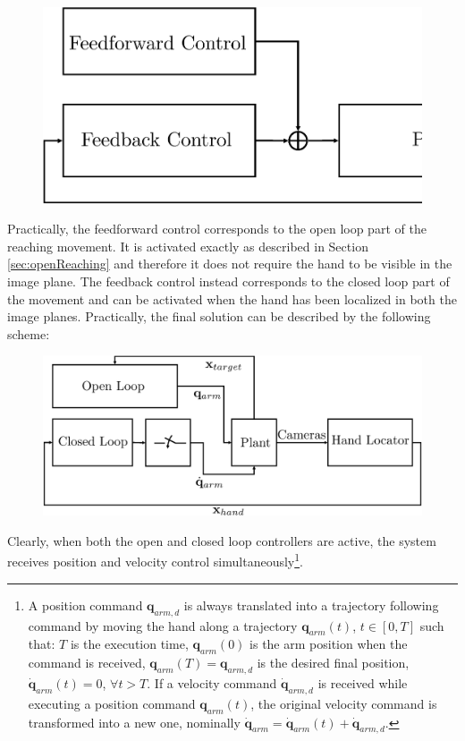 \begin{figure}[th!]
\begin{center}
\includegraphics[scale = 0.25]{Figure/OpenVSClosedLoop.eps}
\end{center}
\end{figure}

Practically, the feedforward control corresponds to the open loop part of the reaching movement.
It is activated exactly as described in Section \ref{sec:openReaching} and therefore it does not
require the hand to be visible in the image plane. The feedback control
instead corresponds to the closed loop part of the movement and can be activated when the hand
has been localized in both the image planes. Practically, the final solution can be described by the 
following scheme:

\begin{figure}[th!]
\begin{center}
\includegraphics[scale = 0.25]{Figure/OpenVSClosedLoopSwitch.eps}
\end{center}
\end{figure}

Clearly, when both the open and closed loop controllers are active, the system receives position 
and velocity control simultaneously\footnote{A position command ${\mathbf q}_{arm,d}$ is 
always translated into a trajectory following command by moving 
the hand along a trajectory $\mathbf q_{arm}(t)$, $t \in [0, T]$ such that: $T$ is the execution time,
$\mathbf q_{arm}(0)$ is the arm position when the command is received, $\mathbf q_{arm}(T) = {\mathbf q}_{arm,d}$
is the desired final position, $\dot {\mathbf q}_{arm}(t) = 0$, $ \forall t > T$. If a velocity command $\dot {\mathbf q}_{arm,d}$ is received while executing a position
command $\mathbf q_{arm}(t)$, the original velocity command is transformed into a new one, nominally
$\dot {\mathbf q}_{arm} = \dot {\mathbf q}_{arm}(t) + \dot {\mathbf q}_{arm, d}$.}. 

